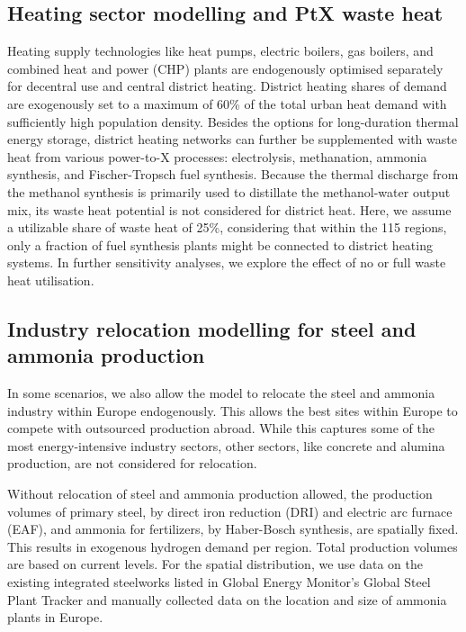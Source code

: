 \subsection*{Heating sector modelling and PtX waste heat}

Heating supply technologies like heat pumps, electric boilers, gas boilers, and
combined heat and power (CHP) plants are endogenously optimised separately for
decentral use and central district heating. District heating shares of demand
are exogenously set to a maximum of 60\% of the total urban heat demand with
sufficiently high population density. Besides the options for long-duration
thermal energy storage, district heating networks can further be supplemented
with waste heat from various power-to-X processes: electrolysis, methanation,
ammonia synthesis, and Fischer-Tropsch fuel synthesis. Because the thermal
discharge from the methanol synthesis is primarily used to distillate the
methanol-water output mix,\cite{brownUltralongdurationEnergyStorage2023} its
waste heat potential is not considered for district heat. Here, we assume a
utilizable share of waste heat of 25\%, considering that within the 115 regions,
only a fraction of fuel synthesis plants might be connected to district heating
systems. In further sensitivity analyses, we explore the effect of no or full
waste heat utilisation.


\subsection*{Industry relocation modelling for steel and ammonia production}

In some scenarios, we also allow the model to relocate the steel and ammonia
industry within Europe endogenously. This allows the best sites within Europe to
compete with outsourced production abroad. While this captures some of the most
energy-intensive industry sectors, other sectors, like concrete and alumina
production, are not considered for relocation.

Without relocation of steel and ammonia production allowed, the production
volumes of primary steel, by direct iron reduction (DRI) and electric arc
furnace (EAF), and ammonia for fertilizers, by Haber-Bosch synthesis, are
spatially fixed. This results in exogenous hydrogen demand per region. Total
production volumes are based on current
levels.\cite{unitedstatesgeologicalsurveyAmmoniaProductionCountry2022,europeancommission.jointresearchcentre.JRCIDEES2021IntegratedDatabase2024}
For the spatial distribution, we use data on the existing integrated steelworks
listed in Global Energy Monitor's Global Steel Plant Tracker
\cite{globalenergymonitorGlobalSteelPlant2024} and manually collected data on
the location and size of ammonia plants in Europe.

